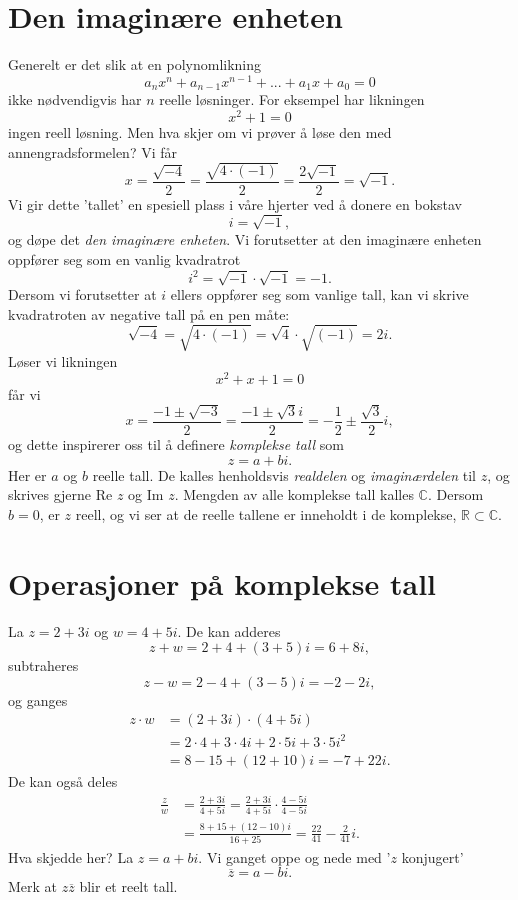 

\label{ch:komplekse-tall}
\section*{Den imaginære enheten}
Generelt er det slik at en polynomlikning
\[
a_nx^n+a_{n-1}x^{n-1}+...+a_1x+a_0=0
\]
ikke nødvendigvis har $n$ reelle løsninger. For eksempel har likningen 
\[
x^2+1=0
\]
ingen reell løsning. Men hva skjer om vi prøver å løse den med annengradsformelen? Vi får
\[
x=\frac{\sqrt{-4}}{2}=\frac{\sqrt{4\cdot (-1)}}{2}=\frac{2\sqrt{-1}}{2}=\sqrt{-1}.
\]
Vi gir dette 'tallet' en spesiell plass i våre hjerter ved å donere en bokstav
\[
i=\sqrt{-1},
\]
og døpe det \emph{den imaginære enheten}. Vi forutsetter at den imaginære enheten oppfører seg som en vanlig kvadratrot
\[
i^2=\sqrt{-1}\cdot\sqrt{-1}=-1.
\]
Dersom vi forutsetter at $i$ ellers oppfører seg som vanlige tall, kan vi skrive kvadratroten av negative tall på en pen måte:
\begin{equation*}
\sqrt{-4}=\sqrt{4\cdot (-1)}=\sqrt{4}\cdot \sqrt{(-1)}=2i.
\end{equation*}
Løser vi likningen
\[
x^2+x+1=0
\]
får vi 
\[
x=\frac{-1\pm \sqrt{-3}}{2}=\frac{-1\pm \sqrt{3}i}{2}=-\frac{1}{2}\pm\frac{\sqrt{3}}{2}i,
\]
og dette inspirerer oss til å definere \emph{komplekse tall} som 
\[
z=a+bi.
\]
Her er $a$ og $b$ reelle tall. De kalles henholdsvis \emph{realdelen} og \emph{imaginærdelen} til $z$, og skrives gjerne Re $z$ og Im $z$. Mengden av alle komplekse tall kalles $\mathbb C$. Dersom $b=0$, er $z$ reell, og vi ser at de reelle tallene er inneholdt i de komplekse, $\mathbb R \subset \mathbb C$.


\section*{Operasjoner på komplekse tall}
La $z=2+3i$ og $w=4+5i$. De kan adderes
\[
z+w=2+4+(3+5)i=6+8i,
\]
subtraheres
\[
z-w=2-4+(3-5)i=-2-2i,
\]
og ganges 
\begin{align*}
z\cdot w&=(2+3i)\cdot(4+5i)\\&=2\cdot 4+3\cdot 4i+2\cdot 5i+3\cdot 5 i^2\\&=8-15+(12+10)i=-7+22i.
\end{align*}
De kan også deles
\begin{align*}
\frac{z}{w}&=\frac{2+3i}{4+5i}=\frac{2+3i}{4+5i}\cdot\frac{4-5i}{4-5i}\\&=\frac{8+15+(12-10)i}{16+25}=\frac{22}{41}-\frac{2}{41}i.
\end{align*}
Hva skjedde her? La $z=a+bi$. Vi ganget oppe og nede med '$z$ konjugert'
\[
\overline z =a-bi.
\]
Merk at $z\overline z$ blir et reelt tall. 



